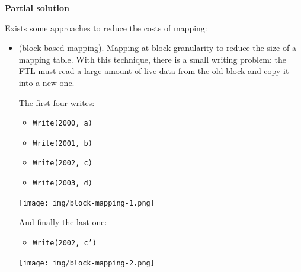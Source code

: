\highspace
\begin{flushleft}
    \textcolor{Green3}{ \textbf{Partial solution}}
\end{flushleft}
Exists some approaches to reduce the costs of mapping:
\begin{itemize}
    \item {} (block-based mapping). Mapping at block granularity to reduce the size of a mapping table. With this technique, there is a small writing problem: the FTL must read a large amount of live data from the old block and copy it into a new one.
    \begin{examplebox}
        The first four writes:
        \begin{multicols}{2}
            \begin{itemize}
                \item \texttt{Write(2000, a)}
                \item \texttt{Write(2001, b)}
                \item \texttt{Write(2002, c)}
                \item \texttt{Write(2003, d)}
            \end{itemize}
        \end{multicols}
        \begin{center}
            \texttt{[image: img/block-mapping-1.png]}
        \end{center}

        \noindent
        And finally the last one:
        \begin{itemize}
            \item \texttt{Write(2002, c')}
        \end{itemize}
        \begin{center}
            \texttt{[image: img/block-mapping-2.png]}
        \end{center}
    \end{examplebox}
    

\end{itemize}
